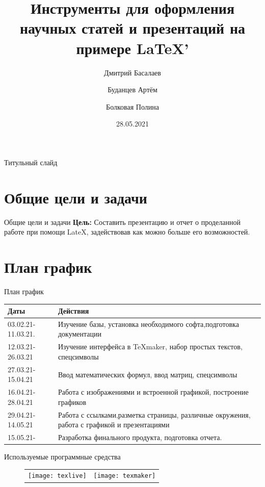 \documentclass{beamer}
\title[Презентация]{Инструменты для оформления научных статей и презентаций на примере \LaTeX'}
\institute{КемГУ}
\author{Дмитрий Басалаев \and Буданцев Артём \and Болковая Полина}
\date{28.05.2021}
\begin{document}
\newlength\someheight
\setlength\someheight{2cm}



\begin{frame}{Титульный слайд}
\maketitle
\end{frame}

\section{Общие цели и задачи}
\begin{frame}{Общие цели и задачи}
\textbf{Цель:} Составить презентацию и отчет о проделанной работе при помощи LateX, задействовав как можно больше его возможностей.
\end{frame}

\section{План график}
\begin{frame}{План график}
\begin{tabular}{| l| p{6.7cm}|}
\hline {\bfseries \large Даты} & {\bfseries \large Действия}\\ \hline
03.02.21-11.03.21. & Изучение базы, установка необходимого софта,подготовка документации\\ \hline
12.03.21-26.03.21 & Изучение интерфейса в \TeX maker, набор простых текстов, спецсимволы \\ \hline
27.03.21-15.04.21 & Ввод математических формул, ввод матриц, спецсимволы  \\ \hline
16.04.21-28.04.21 & Работа с изображениями и встроенной графикой, построение графиков \\ \hline 
29.04.21-14.05.21 & Работа с ссылками,разметка страницы, различные окружения, работа с графикой и презентациями \\ \hline
15.05.21- & Разработка финального продукта, подготовка отчета. \\ \hline
\end{tabular}

\end{frame}

\begin{frame}{Используемые программные средства}
\begin{figure}[h]
\begin{tabular}{cc}
\texttt{[image: texlive]}
&
\texttt{[image: texmaker]}
\end{tabular}
\end{figure}



\end{frame}
\end{document}
